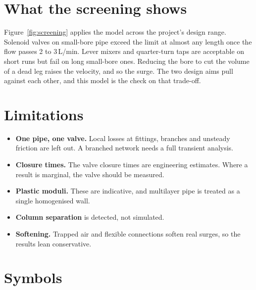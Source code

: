 \documentclass[a4paper,justified,nobib]{tufte-handout}
\newcommand{\lpm}{\,L/min}
\newcommand{\sidecite}[2][]{\sidenote{\citet{#2}\ifx&#1&\else, #1\fi.}}
\begin{document}
\section{What the screening shows}

Figure~\ref{fig:screening} applies the model across the project's design range.
Solenoid valves on small-bore pipe exceed the limit at almost any length once
the flow passes 2 to 3\lpm{}. Lever mixers and quarter-turn taps are acceptable
on short runs but fail on long small-bore ones. Reducing the bore to cut the
volume of a dead leg raises the velocity, and so the surge. The two design aims
pull against each other, and this model is the check on that trade-off.

\section{Limitations}

\begin{itemize}
  \item \textbf{One pipe, one valve.} Local losses at fittings, branches and
    unsteady friction are left out. A branched network needs a full transient
    analysis.\sidecite{chaudhry2014}
  \item \textbf{Closure times.} The valve closure times are engineering
    estimates. Where a result is marginal, the valve should be measured.
  \item \textbf{Plastic moduli.} These are indicative, and multilayer pipe is
    treated as a single homogenised wall.
  \item \textbf{Column separation} is detected, not simulated.
  \item \textbf{Softening.} Trapped air and flexible connections soften real
    surges, so the results lean conservative.
\end{itemize}

\section*{Symbols}
\end{document}
